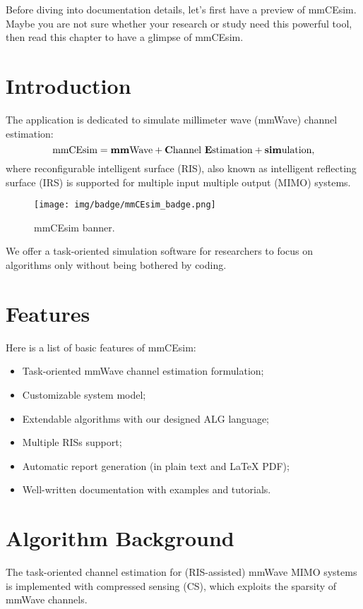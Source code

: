 Before diving into documentation details, let's first have a preview of mmCEsim.
Maybe you are not sure whether your research or study need this powerful tool,
then read this chapter to have a glimpse of mmCEsim.

\section{Introduction}

The application is dedicated to simulate
millimeter wave (mmWave) channel estimation:
\[
  \text{mmCEsim}
  =\text{\textbf{mm}Wave}
  +\text{\textbf{C}hannel \textbf{E}stimation}
  +\text{\textbf{sim}ulation},
\]
where reconfigurable intelligent surface (RIS),
also known as intelligent reflecting surface (IRS) \cite{wu2019towards} is supported
for multiple input multiple output (MIMO) systems.

\begin{figure}[htbp]
  \texttt{[image: img/badge/mmCEsim\_badge.png]}
  \caption{mmCEsim banner.}
\end{figure}

We offer a task-oriented simulation software for researchers to focus on algorithms only
without being bothered by coding.

\section{Features}

Here is a list of basic features of mmCEsim:
\begin{itemize}
  \item Task-oriented mmWave channel estimation formulation;
  \item Customizable system model;
  \item Extendable algorithms with our designed ALG language;
  \item Multiple RISs support;
  \item Automatic report generation (in plain text and \LaTeX{} PDF);
  \item Well-written documentation with examples and tutorials.
\end{itemize}

\section{Algorithm Background}

The task-oriented channel estimation for (RIS-assisted) mmWave MIMO systems
is implemented with compressed sensing (CS),
which exploits the sparsity of mmWave channels.

